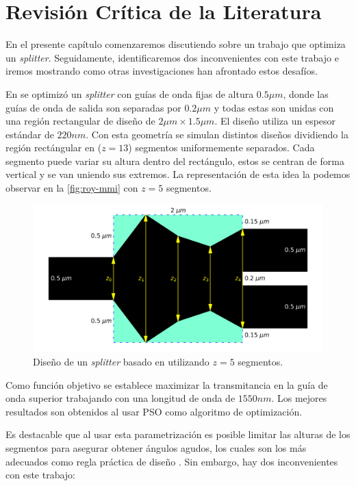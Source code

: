 \chapter{Revisión Crítica de la Literatura}

En el presente capítulo comenzaremos discutiendo sobre un trabajo que optimiza un \emph{splitter}.
Seguidamente, identificaremos dos inconvenientes con este trabajo e iremos mostrando como otras 
investigaciones han afrontado estos desafíos.

En \cite{Prosopio-Galarza2019} se optimizó un \emph{splitter} con guías de onda fijas de altura $0.5 \mu m$, 
donde las guías de onda de salida son separadas por $0.2 \mu m$ y 
todas estas son unidas con una región rectangular de diseño de $2 \mu m \times 1.5 \mu m$.
El diseño utiliza un espesor estándar de $220 nm$.
Con esta geometría se simulan distintos diseños dividiendo la región rectángular en ($z = 13$) segmentos
uniformemente separados.
Cada segmento puede variar su altura dentro del rectángulo, estos se centran de forma vertical y
se van uniendo sus extremos. 
La representación de esta idea la podemos observar en la \autoref{fig:roy-mmi} con $z = 5$ segmentos.

\begin{figure}[ht]
  \centering
  \includegraphics[scale=0.5]{image/related-works/mmi-angles.png}
  \caption{Diseño de un \emph{splitter} basado en \citep{Prosopio-Galarza2019} utilizando $z = 5$ segmentos.} 
  \label{fig:roy-mmi}
\end{figure}

Como función objetivo se establece maximizar la transmitancia en la guía de onda superior trabajando con una
longitud de onda de $1550 nm$.
Los mejores resultados son obtenidos al usar PSO como algoritmo de optimización.

Es destacable que al usar esta parametrización es posible limitar las alturas de los segmentos para asegurar 
obtener ángulos agudos, los cuales son los más adecuados como regla práctica de diseño
\citep{LukasChrostowski2010}.
Sin embargo, hay dos inconvenientes con este trabajo:

